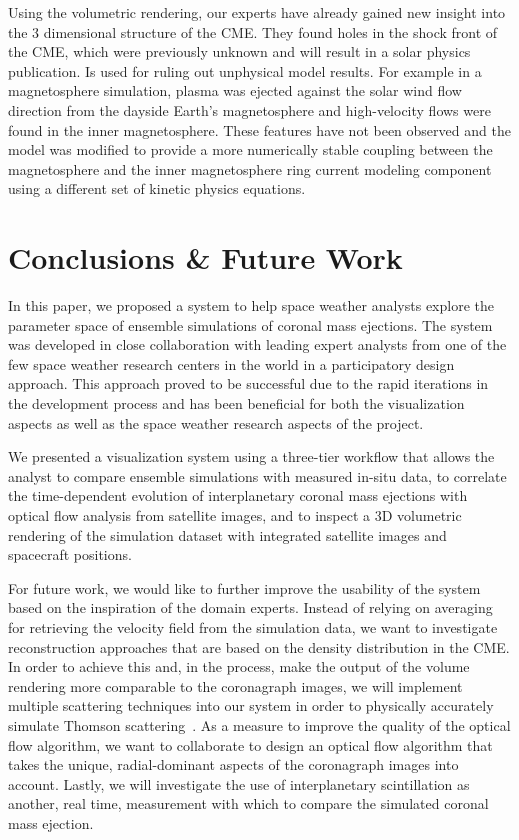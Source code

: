 \documentclass[journal]{vgtc}                %
\begin{document}
Using the volumetric rendering, our experts have already gained new insight into the 3 dimensional structure of the CME. They found holes in the shock front of the CME, which were previously unknown and will result in a solar physics publication. Is used for ruling out unphysical model results. For example in a magnetosphere simulation, plasma was ejected against the solar wind flow direction from the dayside Earth's magnetosphere and high-velocity flows were found in the inner magnetosphere. These features have not been observed and the model was modified to provide a more numerically stable coupling between the magnetosphere and the inner magnetosphere ring current modeling component using a different set of kinetic physics equations.

\section{Conclusions \& Future Work} \label{sec:futurework}
In this paper, we proposed a system to help space weather analysts explore the parameter space of ensemble simulations of coronal mass ejections. The system was developed in close collaboration with leading expert analysts from one of the few space weather research centers in the world in a participatory design approach. This approach proved to be successful due to the rapid iterations in the development process and has been beneficial for both the visualization aspects as well as the space weather research aspects of the project.

We presented a visualization system using a three-tier workflow that allows the analyst to compare ensemble simulations with measured in-situ data, to correlate the time-dependent evolution of interplanetary coronal mass ejections with optical flow analysis from satellite images, and to inspect a 3D volumetric rendering of the simulation dataset with integrated satellite images and spacecraft positions. 

For future work, we would like to further improve the usability of the system based on the inspiration of the domain experts. Instead of relying on averaging for retrieving the velocity field from the simulation data, we want to investigate reconstruction approaches that are based on the density distribution in the CME. In order to achieve this and, in the process, make the output of the volume rendering more comparable to the coronagraph images, we will implement multiple scattering techniques into our system in order to physically accurately simulate Thomson scattering~\cite{howard2012thomson}. As a measure to improve the quality of the optical flow algorithm, we want to collaborate to design an optical flow algorithm that takes the unique, radial-dominant aspects of the coronagraph images into account. Lastly, we will investigate the use of interplanetary scintillation as another, real time, measurement with which to compare the simulated coronal mass ejection.
\end{document}
